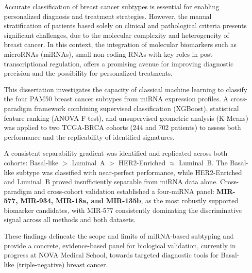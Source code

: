 
%

Accurate classification of breast cancer subtypes is essential for enabling
personalized diagnosis and treatment strategies. However, the manual
stratification of patients based solely on clinical and pathological criteria
presents significant challenges, due to the molecular complexity and
heterogeneity of breast cancer. In this context, the integration of molecular
biomarkers such as microRNAs (miRNAs), small non-coding RNAs with key roles in
post-transcriptional regulation, offers a promising avenue for improving
diagnostic precision and the possibility for personalized treatments.

This dissertation investigates the capacity of classical machine learning to
classify the four PAM50 breast cancer subtypes from miRNA expression profiles.
A cross-paradigm framework combining supervised classification (XGBoost),
statistical feature ranking (ANOVA F-test), and unsupervised geometric
analysis (K-Means) was applied to two TCGA-BRCA cohorts (244 and
702 patients) to assess both performance and the replicability of identified
signatures.

A consistent separability gradient was identified and replicated across both
cohorts: Basal-like $>$ Luminal~A $>$ HER2-Enriched $\approx$ Luminal~B.
The Basal-like subtype was classified with near-perfect performance, while
HER2-Enriched and Luminal~B proved insufficiently separable from miRNA data
alone. Cross-paradigm and cross-cohort validation established a four-miRNA
panel: \textbf{MIR-577, MIR-934, MIR-18a, and MIR-135b}, as the most
robustly supported biomarker candidates, with MIR-577 consistently dominating
the discriminative signal across all methods and both datasets.

These findings delineate the scope and limits of miRNA-based subtyping and
provide a concrete, evidence-based panel for biological validation, currently
in progress at NOVA Medical School, towards targeted diagnostic tools for
Basal-like (triple-negative) breast cancer.

